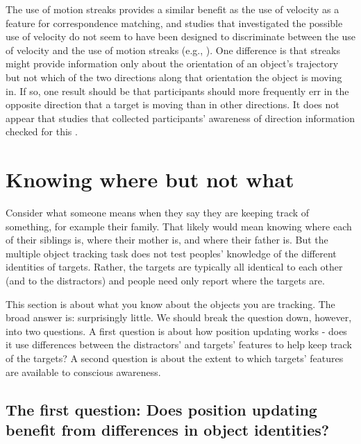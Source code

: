 \documentclass[
]{book}
\begin{document}
The use of motion streaks provides a similar benefit as the use of velocity as a feature for correspondence matching, and studies that investigated the possible use of velocity do not seem to have been designed to discriminate between the use of velocity and the use of motion streaks (e.g., \citet{wangRoleKinematicProperties2021}). One difference is that streaks might provide information only about the orientation of an object's trajectory but not which of the two directions along that orientation the object is moving in. If so, one result should be that participants should more frequently err in the opposite direction that a target is moving than in other directions. It does not appear that studies that collected participants' awareness of direction information checked for this \citep[e.g.][]{shoonerHighcapacityTransientRetention2010, horowitzDirectionInformationMultiple2010}.

\hypertarget{identity}{%
\chapter{Knowing where but not what}\label{identity}}

Consider what someone means when they say they are keeping track of something, for example their family. That likely would mean knowing where each of their siblings is, where their mother is, and where their father is. But the multiple object tracking task does not test peoples' knowledge of the different identities of targets. Rather, the targets are typically all identical to each other (and to the distractors) and people need only report where the targets are.

This section is about what you know about the objects you are tracking. The broad answer is: surprisingly little. We should break the question down, however, into two questions. A first question is about how position updating works - does it use differences between the distractors' and targets' features to help keep track of the targets? A second question is about the extent to which targets' features are available to conscious awareness.

\hypertarget{the-first-question-does-position-updating-benefit-from-differences-in-object-identities}{%
\section{The first question: Does position updating benefit from differences in object identities?}\label{the-first-question-does-position-updating-benefit-from-differences-in-object-identities}}
\end{document}
